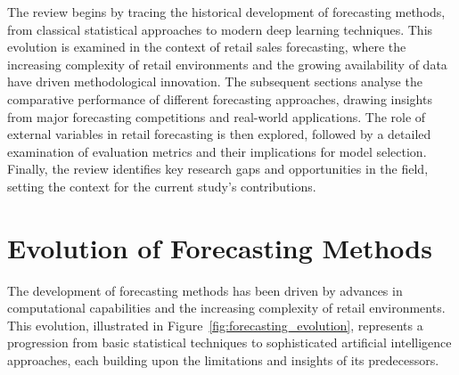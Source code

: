 \documentclass[12pt,a4paper]{report}
\begin{document}
The review begins by tracing the historical development of forecasting methods, from classical statistical approaches to modern deep learning techniques. This evolution is examined in the context of retail sales forecasting, where the increasing complexity of retail environments and the growing availability of data have driven methodological innovation. The subsequent sections analyse the comparative performance of different forecasting approaches, drawing insights from major forecasting competitions and real-world applications. The role of external variables in retail forecasting is then explored, followed by a detailed examination of evaluation metrics and their implications for model selection. Finally, the review identifies key research gaps and opportunities in the field, setting the context for the current study's contributions.

\section{Evolution of Forecasting Methods}

The development of forecasting methods has been driven by advances in computational capabilities and the increasing complexity of retail environments. This evolution, illustrated in Figure~\ref{fig:forecasting_evolution}, represents a progression from basic statistical techniques to sophisticated artificial intelligence approaches, each building upon the limitations and insights of its predecessors.
\end{document}
